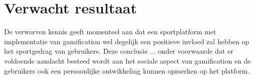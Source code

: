 



\section{Verwacht resultaat}%
\label{sec:verwachte_resultaten}

De verworven kennis geeft momenteel aan dat een sportplatform met implementatie van gamification wel degelijk een positieve invloed zal hebben op het sportgedrag van gebruikers. Deze conclusie ... onder voorwaarde dat er voldoende aandacht besteed wordt aan het sociale aspect van gamification en de gebruikers ook een persoonlijke ontwikkeling kunnen opmerken op het platform.





